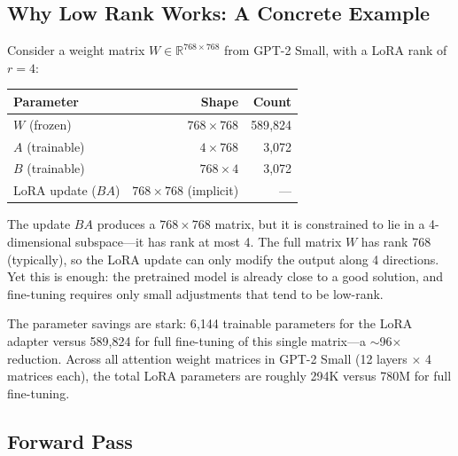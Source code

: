 \subsection{Why Low Rank Works: A Concrete Example}

Consider a weight matrix $W \in \mathbb{R}^{768 \times 768}$ from
GPT-2 Small, with a LoRA rank of $r = 4$:

\begin{center}
\begin{tabular}{lrr}
\toprule
\textbf{Parameter} & \textbf{Shape} & \textbf{Count} \\
\midrule
$W$ (frozen) & $768 \times 768$ & 589{,}824 \\
$A$ (trainable) & $4 \times 768$ & 3{,}072 \\
$B$ (trainable) & $768 \times 4$ & 3{,}072 \\
LoRA update ($BA$) & $768 \times 768$ (implicit) & --- \\
\bottomrule
\end{tabular}
\end{center}

The update $BA$ produces a $768 \times 768$ matrix, but it is
constrained to lie in a 4-dimensional subspace---it has rank at most 4.
The full matrix $W$ has rank 768 (typically), so the LoRA update can
only modify the output along 4 directions. Yet this is enough: the
pretrained model is already close to a good solution, and fine-tuning
requires only small adjustments that tend to be low-rank.

The parameter savings are stark: 6{,}144 trainable parameters for the
LoRA adapter versus 589{,}824 for full fine-tuning of this single
matrix---a $\sim$96$\times$ reduction. Across all attention weight
matrices in GPT-2 Small (12 layers $\times$ 4 matrices each), the
total LoRA parameters are roughly 294K versus 780M for full
fine-tuning.

\subsection{Forward Pass}

